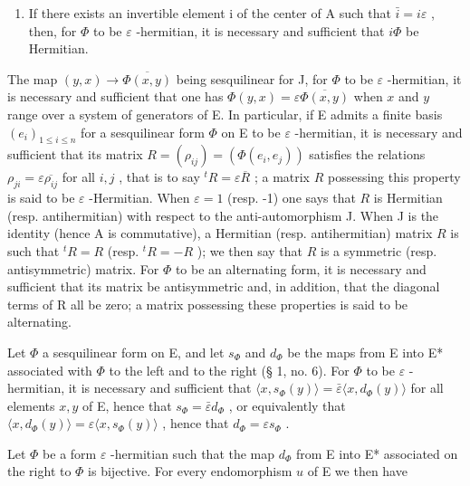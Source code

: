\begin{enumerate}
\def\labelenumi{\arabic{enumi})}
\setcounter{enumi}{1}
\tightlist
\item
  If there exists an invertible element i of the center of A such that \(\bar{i}=i\varepsilon\) , then, for \(\Phi\) to be \(\varepsilon\) -hermitian, it is necessary and sufficient that \(i\Phi\) be Hermitian.
\end{enumerate}

The map \((y, x) \to \overline{\Phi(x, y)}\) being sesquilinear for J, for \(\Phi\) to be \(\varepsilon\) -hermitian, it is necessary and sufficient that one has \(\Phi(y, x) = \varepsilon \overline{\Phi(x, y)}\) when \(x\) and \(y\) range over a system of generators of E. In particular, if E admits a finite basis \((e_i)_{1 \leqslant i \leqslant n}\) for a sesquilinear form \(\Phi\) on E to be \(\varepsilon\) -hermitian, it is necessary and sufficient that its matrix \(R = (\rho_{ij}) = (\Phi(e_i, e_j))\) satisfies the relations \(\rho_{ji} = \varepsilon \overline{\rho_{ij}}\) for all \(i, j\) , that is to say \(^t R = \varepsilon \overline{R}\) ; a matrix \(R\) possessing this property is said to be \(\varepsilon\) -Hermitian. When \(\varepsilon = 1\) (resp. -1) one says that \(R\) is Hermitian (resp. antihermitian) with respect to the anti-automorphism J. When J is the identity (hence A is commutative), a Hermitian (resp. antihermitian) matrix \(R\) is such that \(^t R = R\) (resp. \(^t R = -R\) ); we then say that \(R\) is a symmetric (resp. antisymmetric) matrix. For \(\Phi\) to be an alternating form, it is necessary and sufficient that its matrix be antisymmetric and, in addition, that the diagonal terms of R all be zero; a matrix possessing these properties is said to be alternating.

Let \(\Phi\) a sesquilinear form on E, and let \(s_{\Phi}\) and \(d_{\Phi}\) be the maps from E into E* associated with \(\Phi\) to the left and to the right (§ 1, no. 6). For \(\Phi\) to be \(\varepsilon\) -hermitian, it is necessary and sufficient that \(\langle x, s_{\Phi}(y) \rangle = \bar{\varepsilon} \langle x, d_{\Phi}(y) \rangle\) for all elements \(x, y\) of E, hence that \(s_{\Phi} = \bar{\varepsilon} d_{\Phi}\) , or equivalently that \(\langle x, d_{\Phi}(y) \rangle = \varepsilon \langle x, s_{\Phi}(y) \rangle\) , hence that \(d_{\Phi} = \varepsilon s_{\Phi}\) .

Let \(\Phi\) be a form \(\varepsilon\) -hermitian such that the map \(d_{\Phi}\) from E into E* associated on the right to \(\Phi\) is bijective. For every endomorphism \(u\) of E we then have

